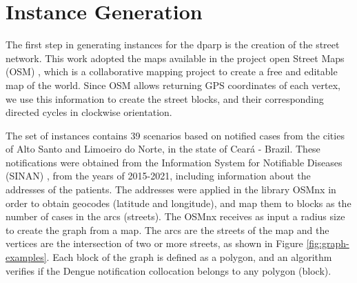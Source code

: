 \documentclass[a4paper,11pt]{article}
\begin{document}
\section{Instance Generation} \label{sec:instance-generation}

The first  step in generating instances  for the \gls{dparp} is  the creation of
the street  network. This work  adopted the maps  available in the  project open
Street Maps (OSM) \citep{haklay:2008}, which  is a collaborative mapping project
to create a free  and editable map of the world. Since  OSM allows returning GPS
coordinates of each vertex, we use this information to create the street blocks,
and their corresponding directed cycles in clockwise orientation.

The set  of instances  contains 39  scenarios based on  notified cases  from the
cities of  Alto Santo and  Limoeiro do  Norte, in the  state of Ceará  - Brazil.
These notifications  were obtained  from the  Information System  for Notifiable
Diseases (SINAN) \citep{laguardia:2004}, from  the years of 2015-2021, including
information about the  addresses of the patients. The addresses  were applied in
the library OSMnx \citep{boeing:2017} in  order to obtain geocodes (latitude and
longitude), and map them to blocks as the number of cases in the arcs (streets).
The OSMnx receives  as input a radius size  to create the graph from  a map. The
arcs are the streets of the map and  the vertices are the intersection of two or
more streets,  as shown  in Figure \ref{fig:graph-examples}.  Each block  of the
graph  is  defined  as a  polygon,  and  an  algorithm  verifies if  the  Dengue
notification collocation belongs to any polygon (block).
\newline
\end{document}

